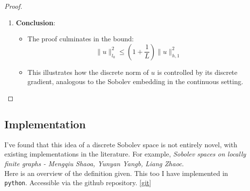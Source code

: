 \documentclass[11pt,a4paper]{article}
\theoremstyle{plain}
\theoremstyle{definition}
\theoremstyle{remark}
\begin{document}
\begin{proof}
\begin{enumerate}
    \item \textbf{Conclusion}:
    \begin{itemize}
        \item The proof culminates in the bound:
        \[ \|u\|_{l_0}^2 \leq \left(1 + \frac{1}{L}\right) \|u\|_{h,1}^2 \]
        \item This illustrates how the discrete norm of $u$ is controlled by its discrete gradient, analogous to the Sobolev embedding in the continuous setting.
    \end{itemize}
\end{enumerate}
\end{proof}

\subsection{Implementation}

I've found that this idea of a discrete Sobolev space is not entirely novel, with existing implementations in the literature. For example, \textit{Sobolev spaces on locally finite graphs - Mengqiu Shaoa, Yunyan Yangb, Liang Zhaoc}. \cite{Sobolevgraphs}\\

Here is an overview of the definition given. This too I have implemented in \verb|python|. Accessible via the github repository. \ref*{git}
\end{document}
